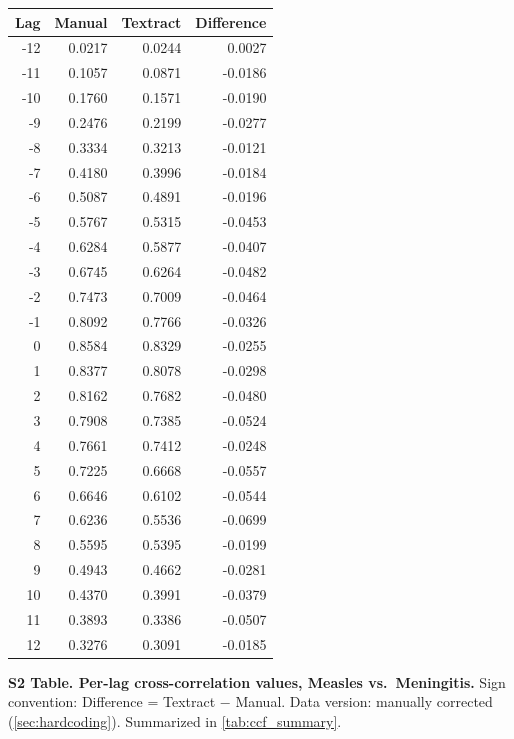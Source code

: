 \documentclass[12pt]{article}
\begin{document}
\begin{table}[h]
\centering
\begin{tabular}{rrrr}
\toprule
Lag & Manual & Textract & Difference \\
\midrule
-12 & 0.0217 & 0.0244 & 0.0027 \\
-11 & 0.1057 & 0.0871 & -0.0186 \\
-10 & 0.1760 & 0.1571 & -0.0190 \\
 -9 & 0.2476 & 0.2199 & -0.0277 \\
 -8 & 0.3334 & 0.3213 & -0.0121 \\
 -7 & 0.4180 & 0.3996 & -0.0184 \\
 -6 & 0.5087 & 0.4891 & -0.0196 \\
 -5 & 0.5767 & 0.5315 & -0.0453 \\
 -4 & 0.6284 & 0.5877 & -0.0407 \\
 -3 & 0.6745 & 0.6264 & -0.0482 \\
 -2 & 0.7473 & 0.7009 & -0.0464 \\
 -1 & 0.8092 & 0.7766 & -0.0326 \\
  0 & 0.8584 & 0.8329 & -0.0255 \\
  1 & 0.8377 & 0.8078 & -0.0298 \\
  2 & 0.8162 & 0.7682 & -0.0480 \\
  3 & 0.7908 & 0.7385 & -0.0524 \\
  4 & 0.7661 & 0.7412 & -0.0248 \\
  5 & 0.7225 & 0.6668 & -0.0557 \\
  6 & 0.6646 & 0.6102 & -0.0544 \\
  7 & 0.6236 & 0.5536 & -0.0699 \\
  8 & 0.5595 & 0.5395 & -0.0199 \\
  9 & 0.4943 & 0.4662 & -0.0281 \\
 10 & 0.4370 & 0.3991 & -0.0379 \\
 11 & 0.3893 & 0.3386 & -0.0507 \\
 12 & 0.3276 & 0.3091 & -0.0185 \\
\bottomrule
\end{tabular}
\end{table}

\bigskip
\noindent\textbf{S2 Table. Per-lag cross-correlation values, Measles vs.\ Meningitis.} Sign convention: Difference = Textract $-$ Manual. Data version: manually corrected (\cref{sec:hardcoding}). Summarized in \cref{tab:ccf_summary}.
\end{document}
